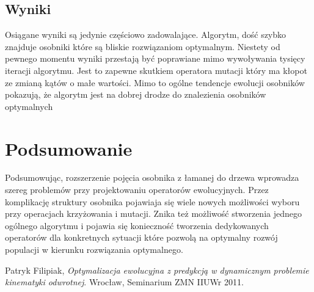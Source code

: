 \documentclass[11pt, leqno]{article}
\begin{document}
\subsection{Wyniki}
Osiągane wyniki są jedynie częściowo zadowalające. Algorytm, dość szybko znajduje osobniki które są bliskie rozwiązaniom optymalnym. Niestety od pewnego momentu wyniki przestają być poprawiane mimo wywoływania tysięcy iteracji algorytmu. Jest to zapewne skutkiem operatora mutacji który ma kłopot ze zmianą kątów o małe wartości. Mimo to ogólne tendencje ewolucji osobników pokazują, że algorytm jest na dobrej drodze do znalezienia osobników optymalnych

\section{Podsumowanie}
Podsumowując, rozszerzenie pojęcia osobnika z łamanej do drzewa wprowadza szereg problemów przy projektowaniu operatorów ewolucyjnych. Przez komplikację struktury osobnika pojawiaja się wiele nowych możliwości wyboru przy operacjach krzyżowania i mutacji. Znika też możliwość stworzenia jednego ogólnego algorytmu i pojawia się konieczność tworzenia dedykowanych operatorów dla konkretnych sytuacji które pozwolą na optymalny rozwój populacji w kierunku rozwiązania optymalnego.

\begin{thebibliography}{1}
	 Patryk Filipiak, {\it Optymalizacja ewolucyjna z predykcją w dynamicznym problemie kinematyki odwrotnej}. Wrocław, Seminarium ZMN IIUWr 2011.
\end{thebibliography}
\end{document}
